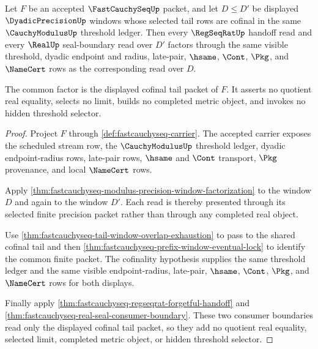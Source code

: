 \begin{theorem}
\label{thm:fastcauchyseq-tail-cofinal-regseqrat-real-boundary}
Let $F$ be an accepted $\FastCauchySeqUp$ packet, and let $D \le D'$ be
displayed $\DyadicPrecisionUp$ windows whose selected tail rows are cofinal in
the same $\CauchyModulusUp$ threshold ledger. Then every $\RegSeqRatUp$ handoff
read and every $\RealUp$ seal-boundary read over $D'$ factors through the same
visible threshold, dyadic endpoint and radius, late-pair, $\hsame$, $\Cont$,
$\Pkg$, and $\NameCert$ rows as the corresponding read over $D$.

The common factor is the displayed cofinal tail packet of $F$. It asserts no
quotient real equality, selects no limit, builds no completed metric object,
and invokes no hidden threshold selector.
\end{theorem}
\begin{proof}
Project $F$ through \autoref{def:fastcauchyseq-carrier}. The accepted carrier
exposes the scheduled stream row, the $\CauchyModulusUp$ threshold ledger,
dyadic endpoint-radius rows, late-pair rows, $\hsame$ and $\Cont$ transport,
$\Pkg$ provenance, and local $\NameCert$ rows.

Apply \autoref{thm:fastcauchyseq-modulus-precision-window-factorization} to
the window $D$ and again to the window $D'$. Each read is thereby presented
through its selected finite precision packet rather than through any completed
real object.

Use \autoref{thm:fastcauchyseq-tail-window-overlap-exhaustion} to pass to the
shared cofinal tail and then
\autoref{thm:fastcauchyseq-prefix-window-eventual-lock} to identify the common
finite packet. The cofinality hypothesis supplies the same threshold ledger and
the same visible endpoint-radius, late-pair, $\hsame$, $\Cont$, $\Pkg$, and
$\NameCert$ rows for both displays.

Finally apply
\autoref{thm:fastcauchyseq-regseqrat-forgetful-handoff} and
\autoref{thm:fastcauchyseq-real-seal-consumer-boundary}. These two consumer
boundaries read only the displayed cofinal tail packet, so they add no quotient
real equality, selected limit, completed metric object, or hidden threshold
selector.
\end{proof}

